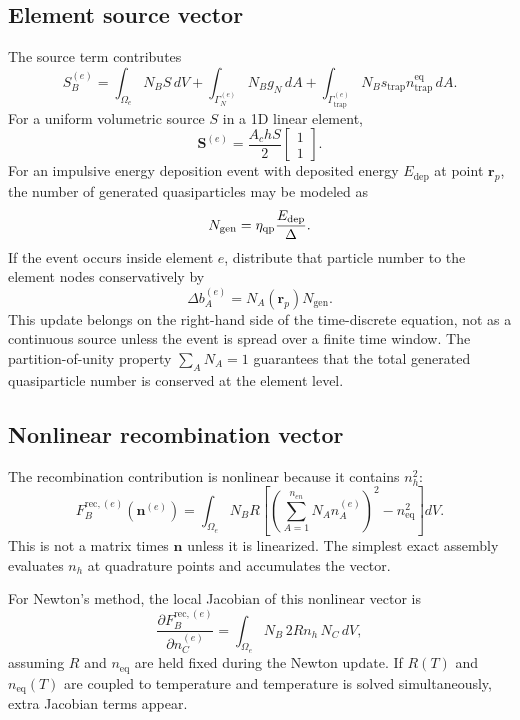\documentclass[11pt]{article}
\newcommand{\br}{{\bm{r}}}
\newcommand{\trap}{\mathrm{trap}}
\newcommand{\rec}{\mathrm{rec}}
\newcommand{\eq}{\mathrm{eq}}
\begin{document}
\subsection{Element source vector}
The source term contributes
\begin{equation}
S_B^{(e)}=\int_{\Omega_e}N_BS\,dV
+\int_{\Gamma_N^{(e)}}N_Bg_N\,dA
+\int_{\Gamma_{\trap}^{(e)}}N_Bs_{\trap}n_{\trap}^{\eq}\,dA.
\label{eq:fem_qp_source_vector}
\end{equation}
For a uniform volumetric source $S$ in a 1D linear element,
\begin{equation}
\bm{S}^{(e)}=\frac{A_chS}{2}
\begin{bmatrix}
1\\1
\end{bmatrix}.
\end{equation}
For an impulsive energy deposition event with deposited energy $E_{\mathrm{dep}}$ at point $\br_p$, the number of generated quasiparticles may be modeled as
\begin{equation}
N_{\mathrm{gen}}=\eta_{\mathrm{qp}}\frac{E_{\mathrm{dep}}}{\Delta}.
\end{equation}
If the event occurs inside element $e$, distribute that particle number to the element nodes conservatively by
\begin{equation}
\Delta b_A^{(e)}=N_A(\br_p)N_{\mathrm{gen}}.
\label{eq:fem_point_deposit_distribution}
\end{equation}
This update belongs on the right-hand side of the time-discrete equation, not as a continuous source unless the event is spread over a finite time window. The partition-of-unity property $\sum_A N_A=1$ guarantees that the total generated quasiparticle number is conserved at the element level.

\subsection{Nonlinear recombination vector}
The recombination contribution is nonlinear because it contains $n_h^2$:
\begin{equation}
F_{B}^{\rec,(e)}(\bm{n}^{(e)})
=\int_{\Omega_e}N_B R\left[\left(\sum_{A=1}^{n_{en}}N_A n_A^{(e)}\right)^2-n_{\eq}^2\right]dV.
\label{eq:fem_qp_recombination_vector}
\end{equation}
This is not a matrix times $\bm{n}$ unless it is linearized. The simplest exact assembly evaluates $n_h$ at quadrature points and accumulates the vector.

For Newton's method, the local Jacobian of this nonlinear vector is
\begin{equation}
\frac{\partial F_B^{\rec,(e)}}{\partial n_C^{(e)}}
=\int_{\Omega_e}N_B\,2R n_h\,N_C\,dV,
\label{eq:fem_qp_recombination_jacobian}
\end{equation}
assuming $R$ and $n_{\eq}$ are held fixed during the Newton update. If $R(T)$ and $n_{\eq}(T)$ are coupled to temperature and temperature is solved simultaneously, extra Jacobian terms appear.
\end{document}
